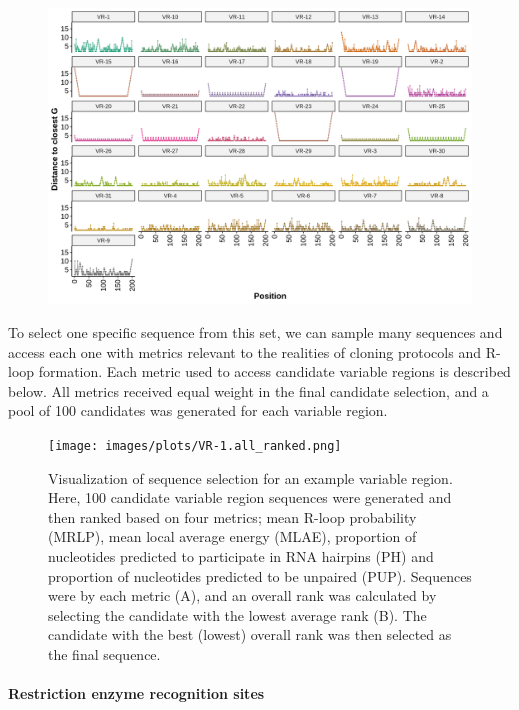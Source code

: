 \documentclass[11pt]{article}
\begin{document}
\begin{figure}[H]
	\includegraphics[width=18cm]{images/plots/VR-clustering.png}
	\centering
	\caption{}
	\label{fig:VR:clustering}
\end{figure}

To select one specific sequence from this set, we can sample many sequences and access each one with metrics relevant to the realities of cloning protocols and R-loop formation. Each metric used to access candidate variable regions is described below. All metrics received equal weight in the final candidate selection, and a pool of 100 candidates was generated for each variable region. 

\begin{figure}[H]
	\texttt{[image: images/plots/VR-1.all\_ranked.png]}
	\centering
	\caption{Visualization of sequence selection for an example variable region. Here, 100 candidate variable region sequences were generated and then ranked based on four metrics; mean R-loop probability (MRLP), mean local average energy (MLAE), proportion of nucleotides predicted to participate in RNA hairpins (PH) and proportion of nucleotides predicted to be unpaired (PUP). Sequences were by each metric (A), and an overall rank was calculated by selecting the candidate with the lowest average rank (B). The candidate with the best (lowest) overall rank was then selected as the final sequence.}
	\label{ranking}
\end{figure}


\paragraph{Restriction enzyme recognition sites}
\end{document}
